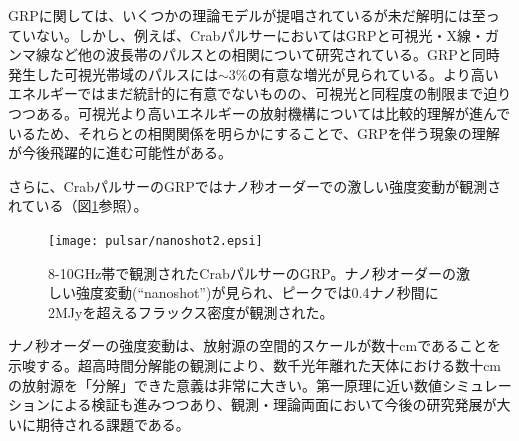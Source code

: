 GRPに関しては、いくつかの理論モデルが提唱されているが\citep{Ly07}未だ解明には至っていない。しかし、例えば、CrabパルサーにおいてはGRPと可視光・X線・ガンマ線など他の波長帯のパルスとの相関について研究されている。GRPと同時発生した可視光帯域のパルスには$\sim 3\%$の有意な増光が見られている\citep{Sh03,St13}。より高いエネルギーではまだ統計的に有意でないものの、可視光と同程度の制限まで迫りつつある\citep{Mi14}。可視光より高いエネルギーの放射機構については比較的理解が進んでいるため\citep{Ta07}、それらとの相関関係を明らかにすることで、GRPを伴う現象の理解が今後飛躍的に進む可能性がある。

さらに、CrabパルサーのGRPではナノ秒オーダーでの激しい強度変動が観測されている\citep{Ha03,Ha07}（図\ref{nano}参照）。
\begin{figure}[t]
\centering
\texttt{[image: pulsar/nanoshot2.epsi]}
\caption{8-10GHz帯で観測されたCrabパルサーのGRP\citep{Ha07}。ナノ秒オーダーの激しい強度変動(``nanoshot'')が見られ、ピークでは0.4ナノ秒間に2MJyを超えるフラックス密度が観測された。}
\label{nano}
\end{figure}%
ナノ秒オーダーの強度変動は、放射源の空間的スケールが数十cmであることを示唆する。超高時間分解能の観測により、数千光年離れた天体における数十cmの放射源を「分解」できた意義は非常に大きい。第一原理に近い数値シミュレーションによる検証も進みつつあり\citep{Ti12}、観測・理論両面において今後の研究発展が大いに期待される課題である。

